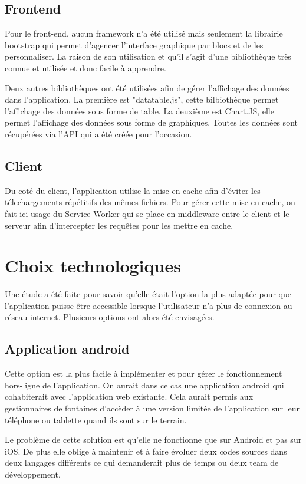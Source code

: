 \documentclass{EPL-master-thesis-covers-FR}
\begin{document}
			\subsection*{Frontend}
				Pour le front-end, aucun framework n'a été utilisé mais seulement la librairie bootstrap qui permet d'agencer l'interface graphique par blocs et de les personnaliser. La raison de son utilisation et qu'il s'agit d'une bibliothèque très connue et utilisée et donc facile à apprendre.
				
				Deux autres bibliothèques ont été utilisées afin de gérer l'affichage des données dans l'application. La première est "datatable.js", cette bilbiothèque permet l'affichage des données sous forme de table. La deuxième est Chart.JS, elle permet l'affichage des données sous forme de graphiques. Toutes les données sont récupérées via l'API qui a été créée pour l'occasion.
				
			\subsection*{Client}
				Du coté du client, l'application utilise la mise en cache afin d'éviter les télechargements répétitifs des mêmes fichiers. Pour gérer cette mise en cache, on fait ici usage du Service Worker qui se place en middleware entre le client et le serveur afin d'intercepter les requêtes pour les mettre en cache.

		
		\section{Choix technologiques}
			\label{sec:choix_tech}
			Une étude a été faite pour savoir qu'elle était l'option la plus adaptée pour que l'application puisse être accessible lorsque l'utilisateur n'a plus de connexion au réseau internet. Plusieurs options ont alors été envisagées.
			
			\subsection*{Application android}
				Cette option est la plus facile à implémenter et pour gérer le fonctionnement hors-ligne de l'application. On aurait dans ce cas une application android qui cohabiterait avec l'application web existante. Cela aurait permis aux gestionnaires de fontaines d'accèder à une version limitée de l'application sur leur téléphone ou tablette quand ils sont sur le terrain.
			
				Le problème de cette solution est qu'elle ne fonctionne que sur Android et pas sur iOS. De plus elle oblige à maintenir et à faire évoluer deux codes sources dans deux langages différents ce qui demanderait plus de temps ou deux team de développement.
				
\end{document}
